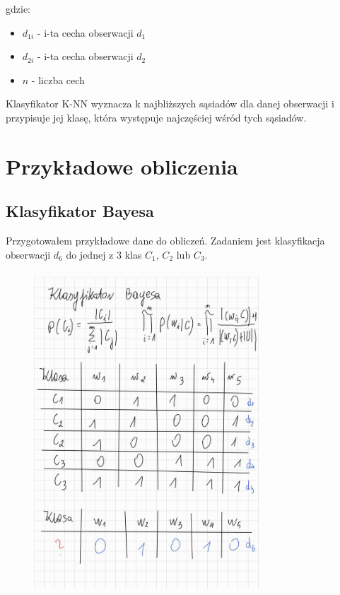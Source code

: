 \documentclass{article}
\begin{document}
gdzie:
\begin{itemize}
    \item $d_{1i}$ - i-ta cecha obserwacji $d_1$
    \item $d_{2i}$ - i-ta cecha obserwacji $d_2$
    \item $n$ - liczba cech
\end{itemize}

Klasyfikator K-NN wyznacza k najbliższych sąsiadów dla danej obserwacji
i przypisuje jej klasę, która występuje najczęściej wśród tych sąsiadów.

\newpage

\section{Przykładowe obliczenia}

\subsection{Klasyfikator Bayesa}

Przygotowałem przykładowe dane do obliczeń. Zadaniem jest
klasyfikacja obserwacji $d_6$ do jednej z 3 klas $C_1$, $C_2$ lub $C_3$.

\begin{figure}[H]
    \centering
    \includegraphics[width=0.75\textwidth]{bayes1.jpg}
\end{figure}
\end{document}
